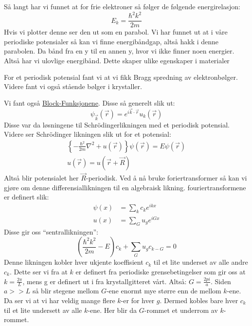 \documentclass{article}
\begin{document}
Så langt har vi funnet at for frie elektroner så følger de følgende energirelasjon:
\begin{equation}
  \label{eq:energi_for_frie_elektroner}
  E_k = \frac{\hbar^2 k^2}{2m}
\end{equation}
Hvis vi plotter denne ser den ut som en parabol. Vi har funnet ut at i våre periodiske potensialer så kan vi finne energibåndgap, altså hakk i denne parabolen. Da bånd fra en y til en annen y, hvor vi ikke finner noen energier. Altså har vi ulovlige energibånd. Dette skaper ulike egenskaper i materialer %

For et periodisk potensial fant vi at vi fikk Bragg spredning av elektronbølger. Videre fant vi også stående bølger i krystaller.

Vi fant også \underline{Block-Funksjonene}. Disse så generelt slik ut:
\begin{equation}
  \label{eq:block_funksjoner}
  \psi_{\vec{k}}(\vec{r}) = e^{i\vec{k}\cdot\vec{r}}u_k(\vec{r})
\end{equation}
Disse var da løsningene til Schrödingerlikningen med et periodisk potensial.
Videre ser Schrödinger likningen slik ut for et potensial:
\begin{align}
  \label{eq:schrödinger_likningen_med_periodisk_potensial}
  \left\{  -\frac{\hbar^2}{2m}\nabla^2 + u(\vec{r})  \right\}\psi(\vec{r}) = E\psi(\vec{r}) \\
  u(\vec{r}) = u(\vec{r} + \vec{R})
\end{align}
Altså blir potensialet her $\vec{R}$-periodisk. Ved å nå bruke foriertransformer så kan vi gjøre om denne differensiallikningen til en algebraisk likning. fouriertransformene er definert slik:
\begin{align}
  \psi(x) &= \sum_k c_k e^{ikx} \\
  u(x) &= \sum_G u_g e^{iGx}
\end{align}
Disse gir oss \enquote{sentrallikningen}:
\begin{equation}
  \label{eq:den_sentrale_likningen}
  \left(\frac{\hbar^2 k^2}{2m} - E\right)c_k + \sum_G u_g c_{k-G} = 0
\end{equation}
Denne likningen kobler hver ukjente koeffisient $c_k$ til et lite underset av alle andre $c_k$. Dette ser vi fra at $k$ er definert fra periodiske grensebetingelser som gir oss at $k = \frac{2\pi}{L}$, mens g er definert ut i fra krystallgitteret vårt. Altså: $G = \frac{2pi}{a}$. Siden $a >> L$ så blir stegene mellom $G$-ene enormt mye større enn de mellom $k$-ene. Da ser vi at vi har veldig mange flere $k$-er for hver $g$. Dermed kobles bare hver $c_k$ til et lite undersett av alle $k$-ene. Her blir da $G$-rommet et underrom av $k$-rommet.
\end{document}
